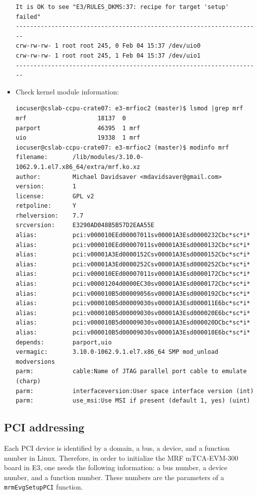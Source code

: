 \documentclass[11pt
  , a4paper
  , article
  , oneside
  , showtrims
]{memoir}
\begin{document}
\begin{itemize}
\begin{lstlisting}[style=termstyle]
It is OK to see "E3/RULES_DKMS:37: recipe for target 'setup' failed"
---------------------------------------------------------------------
crw-rw-rw- 1 root root 245, 0 Feb 04 15:37 /dev/uio0
crw-rw-rw- 1 root root 245, 1 Feb 04 15:37 /dev/uio1
---------------------------------------------------------------------
\end{lstlisting}
\item Check kernel module information:
\begin{lstlisting}[style=termstyle]
iocuser@cslab-ccpu-crate07: e3-mrfioc2 (master)$ lsmod |grep mrf
mrf                    18137  0
parport                46395  1 mrf
uio                    19338  1 mrf
iocuser@cslab-ccpu-crate07: e3-mrfioc2 (master)$ modinfo mrf
filename:       /lib/modules/3.10.0-1062.9.1.el7.x86_64/extra/mrf.ko.xz
author:         Michael Davidsaver <mdavidsaver@gmail.com>
version:        1
license:        GPL v2
retpoline:      Y
rhelversion:    7.7
srcversion:     E3290AD048B5B57D2EAA55E
alias:          pci:v000010EEd00007011sv00001A3Esd0000232Cbc*sc*i*
alias:          pci:v000010EEd00007011sv00001A3Esd0000132Cbc*sc*i*
alias:          pci:v00001A3Ed0000152Csv00001A3Esd0000152Cbc*sc*i*
alias:          pci:v00001A3Ed0000252Csv00001A3Esd0000252Cbc*sc*i*
alias:          pci:v000010EEd00007011sv00001A3Esd0000172Cbc*sc*i*
alias:          pci:v00001204d0000EC30sv00001A3Esd0000172Cbc*sc*i*
alias:          pci:v000010B5d00009056sv00001A3Esd0000192Cbc*sc*i*
alias:          pci:v000010B5d00009030sv00001A3Esd000011E6bc*sc*i*
alias:          pci:v000010B5d00009030sv00001A3Esd000020E6bc*sc*i*
alias:          pci:v000010B5d00009030sv00001A3Esd000020DCbc*sc*i*
alias:          pci:v000010B5d00009030sv00001A3Esd000010E6bc*sc*i*
depends:        parport,uio
vermagic:       3.10.0-1062.9.1.el7.x86_64 SMP mod_unload modversions
parm:           cable:Name of JTAG parallel port cable to emulate (charp)
parm:           interfaceversion:User space interface version (int)
parm:           use_msi:Use MSI if present (default 1, yes) (uint)

\end{lstlisting}
\end{itemize}

\subsection{PCI addressing}
Each PCI device is identified by a domain, a bus, a device, and a function number in Linux. Therefore, in order to initialize the MRF mTCA-EVM-300 board in E3, one needs the following information: a bus number, a device number, and a function number. These numbers are the parameters of a \texttt{mrmEvgSetupPCI} function.\\
\end{document}
